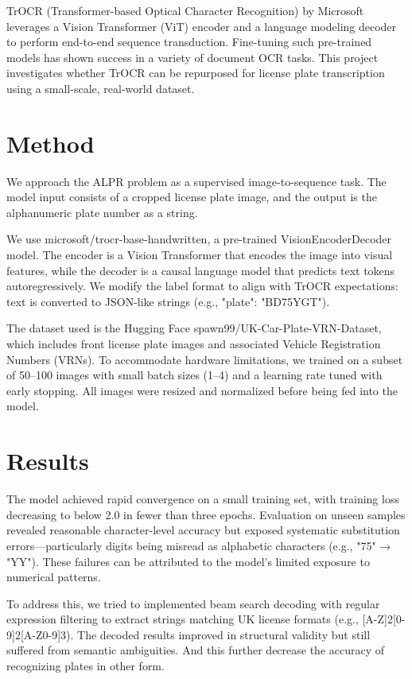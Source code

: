 \documentclass[conference]{IEEEtran}
\begin{document}
TrOCR (Transformer-based Optical Character Recognition) by Microsoft leverages a Vision Transformer (ViT) encoder and a language modeling decoder to perform end-to-end sequence transduction. Fine-tuning such pre-trained models has shown success in a variety of document OCR tasks. This project investigates whether TrOCR can be repurposed for license plate transcription using a small-scale, real-world dataset.

\section{Method}

We approach the ALPR problem as a supervised image-to-sequence task. The model input consists of a cropped license plate image, and the output is the alphanumeric plate number as a string.

We use microsoft/trocr-base-handwritten, a pre-trained VisionEncoderDecoder model. The encoder is a Vision Transformer that encodes the image into visual features, while the decoder is a causal language model that predicts text tokens autoregressively. We modify the label format to align with TrOCR expectations: text is converted to JSON-like strings (e.g., {"plate": "BD75YGT"}).

The dataset used is the Hugging Face spawn99/UK-Car-Plate-VRN-Dataset, which includes front license plate images and associated Vehicle Registration Numbers (VRNs). To accommodate hardware limitations, we trained on a subset of 50–100 images with small batch sizes (1–4) and a learning rate tuned with early stopping. All images were resized and normalized before being fed into the model.

\section{Results}
The model achieved rapid convergence on a small training set, with training loss decreasing to below 2.0 in fewer than three epochs. Evaluation on unseen samples revealed reasonable character-level accuracy but exposed systematic substitution errors—particularly digits being misread as alphabetic characters (e.g., "75" → "YY"). These failures can be attributed to the model's limited exposure to numerical patterns.

To address this, we tried to implemented beam search decoding with regular expression filtering to extract strings matching UK license formats (e.g., [A-Z]{2}[0-9]{2}[A-Z0-9]{3}). The decoded results improved in structural validity but still suffered from semantic ambiguities. And this further decrease the accuracy of recognizing plates in other form.
\end{document}
